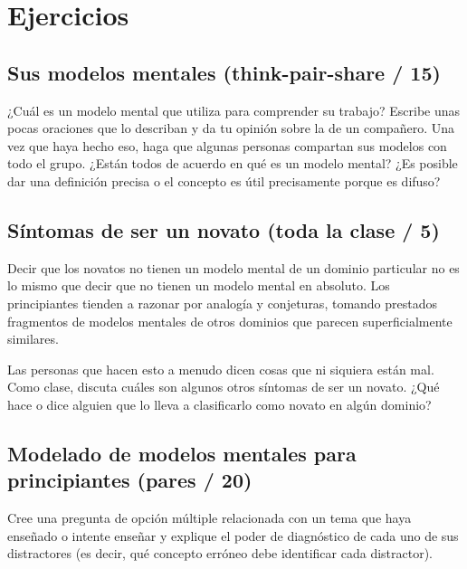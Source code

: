 \documentclass[
]{book}
\begin{document}
\hypertarget{ejercicios-1}{%
\section{Ejercicios}\label{ejercicios-1}}

\hypertarget{sus-modelos-mentales-think-pair-share-15}{%
\subsection{Sus modelos mentales (think-pair-share / 15)}\label{sus-modelos-mentales-think-pair-share-15}}

¿Cuál es un modelo mental que utiliza para comprender su trabajo? Escribe unas pocas oraciones que lo describan y da tu opinión sobre la de un compañero. Una vez que haya hecho eso, haga que algunas personas compartan sus modelos con todo el grupo. ¿Están todos de acuerdo en qué es un modelo mental? ¿Es posible dar una definición precisa o el concepto es útil precisamente porque es difuso?

\hypertarget{suxedntomas-de-ser-un-novato-toda-la-clase-5}{%
\subsection{Síntomas de ser un novato (toda la clase / 5)}\label{suxedntomas-de-ser-un-novato-toda-la-clase-5}}

Decir que los novatos no tienen un modelo mental de un dominio particular no es lo mismo que decir que no tienen un modelo mental en absoluto. Los principiantes tienden a razonar por analogía y conjeturas, tomando prestados fragmentos de modelos mentales de otros dominios que parecen superficialmente similares.

Las personas que hacen esto a menudo dicen cosas que ni siquiera están mal. Como clase, discuta cuáles son algunos otros síntomas de ser un novato. ¿Qué hace o dice alguien que lo lleva a clasificarlo como novato en algún dominio?

\hypertarget{modelado-de-modelos-mentales-para-principiantes-pares-20}{%
\subsection{Modelado de modelos mentales para principiantes (pares / 20)}\label{modelado-de-modelos-mentales-para-principiantes-pares-20}}

Cree una pregunta de opción múltiple relacionada con un tema que haya enseñado o intente enseñar y explique el poder de diagnóstico de cada uno de sus distractores (es decir, qué concepto erróneo debe identificar cada distractor).
\end{document}
